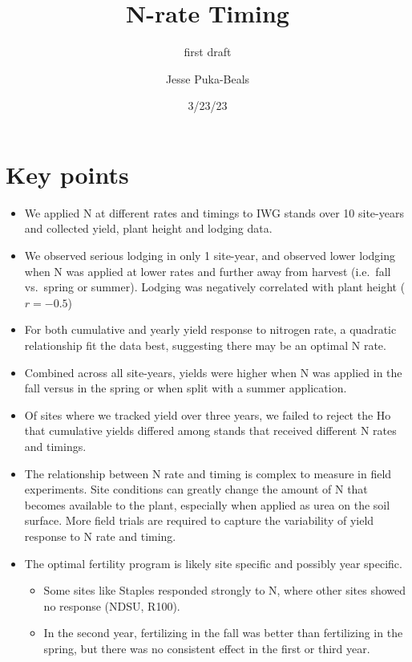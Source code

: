 \documentclass[
  letterpaper,
  DIV=11,
  numbers=noendperiod]{scrartcl}
\title{N-rate Timing}
\subtitle{first draft}
\author{Jesse Puka-Beals}
\date{3/23/23}
\renewcommand*\contentsname{Table of contents}
\newcommand\contentsname{Table of contents}
\begin{document}
\maketitle
\ifdefined\Shaded\renewenvironment{Shaded}{\begin{tcolorbox}[borderline west={3pt}{0pt}{shadecolor}, sharp corners, interior hidden, enhanced, breakable, boxrule=0pt, frame hidden]}{\end{tcolorbox}}\fi

\renewcommand*\contentsname{Table of contents}
{
\hypersetup{linkcolor=}
\setcounter{tocdepth}{3}
\tableofcontents
}
\hypertarget{key-points}{%
\section{Key points}\label{key-points}}

\begin{itemize}
\item
  We applied N at different rates and timings to IWG stands over 10
  site-years and collected yield, plant height and lodging data.
\item
  We observed serious lodging in only 1 site-year, and observed lower
  lodging when N was applied at lower rates and further away from
  harvest (i.e.~fall vs.~spring or summer). Lodging was negatively
  correlated with plant height (\(r=-0.5\))
\item
  For both cumulative and yearly yield response to nitrogen rate, a
  quadratic relationship fit the data best, suggesting there may be an
  optimal N rate.
\item
  Combined across all site-years, yields were higher when N was applied
  in the fall versus in the spring or when split with a summer
  application.
\item
  Of sites where we tracked yield over three years, we failed to reject
  the Ho that cumulative yields differed among stands that received
  different N rates and timings.
\item
  The relationship between N rate and timing is complex to measure in
  field experiments. Site conditions can greatly change the amount of N
  that becomes available to the plant, especially when applied as urea
  on the soil surface. More field trials are required to capture the
  variability of yield response to N rate and timing.
\item
  The optimal fertility program is likely site specific and possibly
  year specific.

  \begin{itemize}
  \item
    Some sites like Staples responded strongly to N, where other sites
    showed no response (NDSU, R100).
  \item
    In the second year, fertilizing in the fall was better than
    fertilizing in the spring, but there was no consistent effect in the
    first or third year.
  \end{itemize}
\end{itemize}
\end{document}
